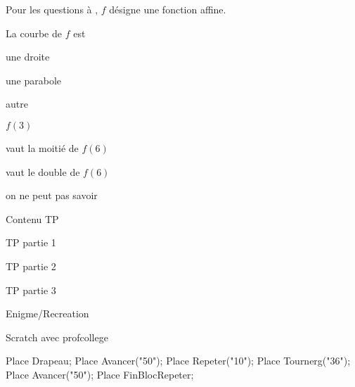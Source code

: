 \documentclass[nocrop]{sesamanuel}
\begin{document}

\begin{QCM}
  \begin{EnonceCommunQCM}
    Pour les questions  à
    , $f$ désigne une
    fonction affine.
    \end{EnonceCommunQCM}

\begin{GroupeQCM}
\begin{exercice}\label{premier-qcm}
La courbe de $f$ est
\begin{ChoixQCM}{3}
\item une droite
\item une parabole
\item autre
\end{ChoixQCM}
\end{exercice}
\begin{corrige}
\end{corrige}
\begin{exercice}\label{deuxieme-qcm}
$f(3)$
\begin{ChoixQCM}{3}
\item vaut la moitié de $f(6)$
\item vaut le double de $f(6)$
\item on ne peut pas savoir
\end{ChoixQCM}
\end{exercice}
\begin{corrige}
\end{corrige}
\end{GroupeQCM}
\end{QCM}

\TravauxPratiques
\begin{TP}
  Contenu TP
  
  TP partie 1
  
  
  TP partie 2
  
  
  TP partie 3 
\end{TP}

\recreation
  \begin{enigme}
    Enigme/Recreation

    Scratch avec profcollege

      \begin{Scratch}
        Place Drapeau;
        Place Avancer("50");
        Place Repeter("10");
        Place Tournerg("36");
        Place Avancer("50");
        Place FinBlocRepeter;
        \end{Scratch}

    \end{enigme}
\end{document}

